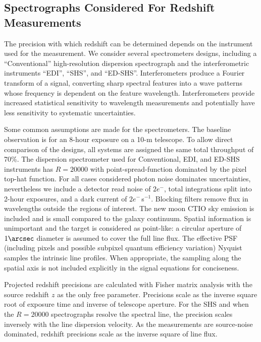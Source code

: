 \documentclass[preprint2, 10pt]{aastex}
\begin{document}
\subsection{Spectrographs Considered For Redshift Measurements} 

The precision with which redshift can be determined depends on the instrument used for the measurement.
We consider several spectrometers designs, including a ``Conventional'' high-resolution dispersion spectrograph and the
interferometric instruments ``EDI'',
``SHS'', and ``ED-SHS''.  Interferometers produce a Fourier transform of a signal, converting sharp
spectral features into a wave patterns whose frequency is dependent on the feature wavelength.  Interferometers provide
increased statistical sensitivity to wavelength measurements and potentially have less sensitivity to systematic
uncertainties.

Some common assumptions are made for the spectrometers.
The baseline observation is for an 8-hour exposure on a 10-m telescope.
To allow direct comparison of the 
designs, all systems are assigned the same total throughput of 70\%.
The dispersion spectrometer used for Conventional, EDI, and ED-SHS instruments has $R=20000$ with
point-spread-function dominated by the pixel top-hat function.
For all cases considered photon noise dominates uncertainties, nevertheless
we include a detector read noise of $2e^-$, total integrations split into 2-hour exposures, and a dark current of $2e^-$\,s$^{-1}$. 
Blocking filters remove flux in wavelengths outside the regions
of interest.  The new moon CTIO sky emission is included and
is small compared to the galaxy continuum.
Spatial information is unimportant and the target is considered as point-like: a
circular aperture of $1\arcsec$ diameter is assumed to cover the full line flux.
The effective PSF (including pixels and possible subpixel quantum efficiency variation) 
Nyquist samples the intrinsic line profiles.
When appropriate, the sampling along the spatial axis is not included explicitly in the
signal equations for conciseness.


Projected redshift precisions are calculated with Fisher matrix analysis with the source
redshift $z$ as the only free parameter. 
Precisions scale as the inverse square root of exposure time and inverse of telescope aperture. 
For the SHS and when the  $R=20000$ spectrographs resolve the spectral line, the precision scales inversely
with the line dispersion velocity.  
As the measurements
are source-noise dominated, redshift precisions scale as the inverse square of line flux. 
\end{document}
